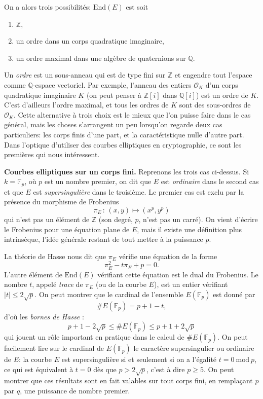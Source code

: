 \documentclass[11pt,a4paper]{article}
\newcommand{\Z}{\mathbb{Z}}
\newcommand{\F}{\mathbb{F}}
\newcommand{\Q}{\mathbb{Q}}
\renewcommand{\O}{\mathcal{O}}
\newcommand{\End}{\mathrm{End}}
\newcommand{\de}{\,:\,}
\renewcommand{\mod}{\ \mathrm{mod}\ }
\renewcommand{\v}{\vspace{5mm}}
\theoremstyle{definition}
\begin{document}
On a alors trois possibilités: $\End(E)$ est soit
\begin{enumerate} 
\item $\Z$, 
\item un ordre dans un corps quadratique imaginaire,
\item un ordre maximal dans une algèbre de quaternions sur $\Q$. 
\end{enumerate}
Un \emph{ordre} est un sous-anneau qui est de type fini sur $\Z$ et engendre tout l'espace comme $\Q$-espace vectoriel. Par exemple, l'anneau des entiers $\O_K$ d'un corps quadratique imaginaire $K$ (on peut penser à $\Z[i]$ dans $\Q[i]$) est un ordre de $K$. C'est d'ailleurs l'ordre maximal, et tous les ordres de $K$ sont des sous-ordres de $\O_K$. Cette alternative à trois choix est le mieux que l'on puisse faire dans le cas général, mais les choses s'arrangent un peu lorsqu'on regarde deux cas particuliers: les corps finis d'une part, et la caractéristique nulle d'autre part. Dans l'optique d'utiliser des courbes elliptiques en cryptographie, ce sont les premières qui nous intéressent.

\v

\textbf{Courbes elliptiques sur un corps fini.} Reprenons les trois cas ci-dessus. Si $k = \F_p$, où $p$ est un nombre premier, on dit que $E$ est \emph{ordinaire} dans le second cas et que $E$ est \emph{supersingulière} dans le troisième. Le premier cas est exclu par la présence du morphisme de Frobenius
$$\pi_E\de (x,y)\mapsto (x^p, y^p)$$
qui n'est pas un élément de $\Z$ (son degré, $p$, n'est pas un carré). On vient d'écrire le Frobenius pour une équation plane de $E$, mais il existe une définition plus intrinsèque, l'idée générale restant de tout mettre à la puissance $p$.

La théorie de Hasse nous dit que $\pi_E$ vérifie une équation de la forme
$$\pi_E^2 - t \pi_E + p = 0.$$
L'autre élément de $\End(E)$ vérifiant cette équation est le dual du Frobenius.
Le nombre $t$, appelé \emph{trace} de $\pi_E$ (ou de la courbe $E$), est un entier vérifiant $|t|\leq 2\sqrt{p}$. On peut montrer que le cardinal de l'ensemble $E(\F_p)$ est donné par
$$\# E(\F_p) = p + 1 - t,$$
d'où les \emph{bornes de Hasse} :
$$p + 1 - 2\sqrt{p} \leq \#E(\F_p) \leq p + 1 + 2\sqrt{p}$$
qui jouent un rôle important en pratique dans le calcul de $\# E(\F_p)$. On peut facilement lire sur le cardinal de $E(\F_p)$ le caractère supersingulier ou ordinaire de $E$: la courbe $E$ est supersingulière si et seulement si on a l'égalité $t = 0 \mod p$, ce qui est équivalent à $t=0$ dès que $p > 2\sqrt{p}$, c'est à dire $p \geq 5$. On peut montrer que ces résultats sont en fait valables sur tout corps fini, en remplaçant $p$ par $q$, une puissance de nombre premier.
\end{document}

